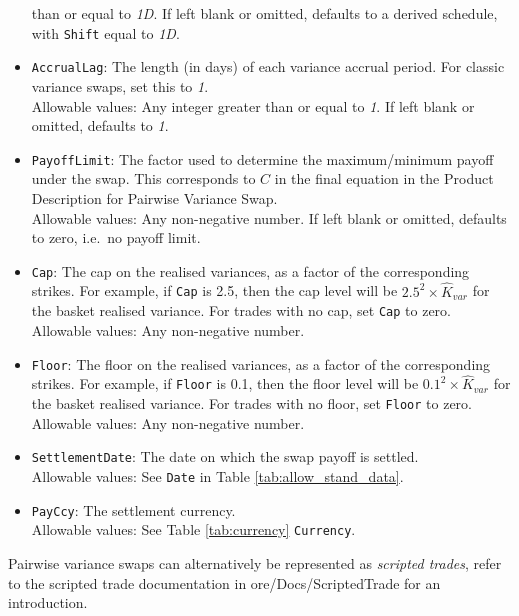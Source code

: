 \begin{itemize}
  than or equal to \emph{1D}. If left blank or omitted, defaults to a derived schedule, with \lstinline!Shift! equal to \emph{1D}.
  \item{} \lstinline!AccrualLag!: The length (in days) of each variance accrual period. For classic variance swaps,
  set this to \emph{1}. \\
    Allowable values: Any integer greater than or equal to \emph{1}. If left blank or omitted, defaults to \emph{1}.
  \item{} \lstinline!PayoffLimit!: The factor used to determine the maximum/minimum payoff under the swap. This corresponds to $C$
  in the final equation in the Product Description for Pairwise Variance Swap. \\
    Allowable values: Any non-negative number. If left blank or omitted, defaults to zero, i.e.\ no payoff limit.
  \item{} \lstinline!Cap!: The cap on the realised variances, as a factor of the corresponding strikes. For example,
  if \lstinline!Cap! is 2.5, then the cap level will be $2.5^2 \times \hat{K}_{var}$ for the basket realised variance.
  For trades with no cap, set \lstinline!Cap! to zero. \\
    Allowable values: Any non-negative number.
  \item{} \lstinline!Floor!:  The floor on the realised variances, as a factor of the corresponding strikes. For example,
  if \lstinline!Floor! is 0.1, then the floor level will be $0.1^2 \times \hat{K}_{var}$ for the basket realised variance.
  For trades with no floor, set \lstinline!Floor! to zero. \\
    Allowable values: Any non-negative number.
  \item{} \lstinline!SettlementDate!: The date on which the swap payoff is settled. \\
    Allowable values: See \lstinline!Date! in Table \ref{tab:allow_stand_data}.
  \item{} \lstinline!PayCcy!: The settlement currency. \\
    Allowable values: See Table \ref{tab:currency} \lstinline!Currency!.
\end{itemize}

Pairwise variance swaps can alternatively be represented as {\em scripted trades}, refer to the scripted trade documentation
in ore/Docs/ScriptedTrade for an introduction.

